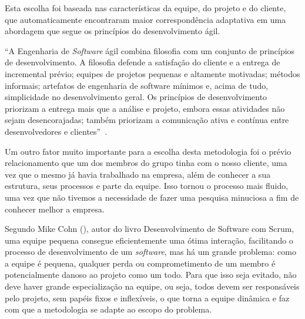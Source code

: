 Esta escolha foi baseada nas características da equipe, do projeto e do cliente, que automaticamente encontraram maior correspondência adaptativa em uma abordagem que segue os princípios do desenvolvimento ágil.

“A Engenharia de \textit{Software} ágil combina filosofia com um conjunto de princípios de desenvolvimento. A filosofia defende a satisfação do cliente e a entrega de incremental prévio; equipes de projetos pequenas e altamente motivadas; métodos informais; artefatos de engenharia de software mínimos e, acima de tudo, simplicidade no desenvolvimento geral. Os princípios de desenvolvimento priorizam a entrega mais que a análise e projeto, embora essas atividades não sejam desencorajadas; também priorizam a comunicação ativa e contínua entre desenvolvedores e clientes”~\cite{pressman}.

Um outro fator muito importante para a escolha desta metodologia foi o prévio relacionamento que um dos membros do grupo tinha com o nosso cliente, uma vez que o mesmo já havia trabalhado na empresa, além de conhecer a sua estrutura, seus processos e parte da equipe. Isso tornou o processo mais fluido, uma vez que não tivemos a necessidade de fazer uma pesquisa minuciosa a fim de conhecer melhor a empresa.

Segundo Mike Cohn (\citeyear{mike}), autor do livro Desenvolvimento de Software com Scrum, uma equipe pequena consegue eficientemente uma ótima interação, facilitando o processo de desenvolvimento de um \textit{software}, mas há um grande problema: como a equipe é pequena, qualquer perda ou comprometimento de um membro é potencialmente danoso ao projeto como um todo. Para que isso seja evitado, não deve haver grande especialização na equipe, ou seja, todos devem ser responsáveis pelo projeto, sem papéis fixos e inflexíveis, o que torna a equipe dinâmica e faz com que a metodologia se adapte ao escopo do problema.
